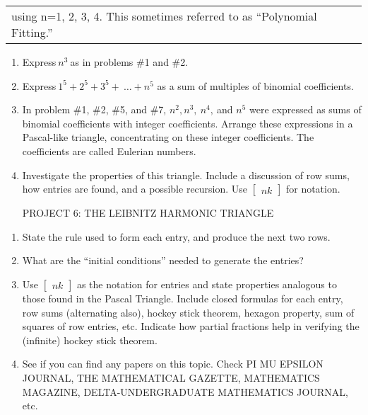 \documentclass[10pt,letter]{article}
\renewenvironment{quote}
  {\begin{tabular}{|p{13cm}}}
  {\end{tabular}}
\begin{document}
\begin{quote}
using n=1, 2, 3, 4. This sometimes referred to as ``Polynomial
Fitting.''

\end{quote}

\begin{enumerate}
\def\labelenumi{\arabic{enumi}.}

\item
  Express\(\ n^{3}\ \)as in problems \#1 and \#2.
\item
  Express\(\ 1^{5} + 2^{5} + 3^{5} + \ \ldots + n^{5}\) as a sum of
  multiples of binomial coefficients.
\item
  In problem \#1, \#2, \#5, and \#7, \(n^{2},n^{3},\ n^{4},\ \)and
  \(n^{5}\) were expressed as sums of binomial coefficients with integer
  coefficients. Arrange these expressions in a Pascal-like triangle,
  concentrating on these integer coefficients. The coefficients are
  called Eulerian numbers.
\item
  Investigate the properties of this triangle. Include a discussion of
  row sums, how entries are found, and a possible recursion. Use
  \(

\begin{bmatrix}
  n 
  k 
  \end{bmatrix}
\) for notation.

PROJECT 6: THE LEIBNITZ HARMONIC TRIANGLE

\end{enumerate}

\begin{enumerate}
\def\labelenumi{\arabic{enumi}.}

\item
  State the rule used to form each entry, and produce the next two rows.
\item
  What are the ``initial conditions'' needed to generate the entries?
\item
  Use \(

\begin{bmatrix}
  n 
  k 
  \end{bmatrix}
\) as the notation for entries and state properties
  analogous to those found in the Pascal Triangle. Include closed
  formulas for each entry, row sums (alternating also), hockey stick
  theorem, hexagon property, sum of squares of row entries, etc.
  Indicate how partial fractions help in verifying the (infinite) hockey
  stick theorem.
\item
  See if you can find any papers on this topic. Check PI MU EPSILON
  JOURNAL, THE MATHEMATICAL GAZETTE, MATHEMATICS MAGAZINE,
  DELTA-UNDERGRADUATE MATHEMATICS JOURNAL, etc.

\end{enumerate}
\end{document}
